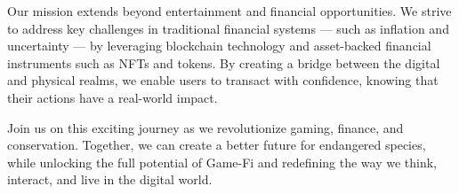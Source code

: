 Our mission extends beyond entertainment and financial opportunities. We strive to address key challenges in traditional financial systems --- such as inflation and uncertainty --- by leveraging blockchain technology and asset-backed financial instruments such as NFTs and tokens. By creating a bridge between the digital and physical realms, we enable users to transact with confidence, knowing that their actions have a real-world impact.

Join us on this exciting journey as we revolutionize gaming, finance, and conservation. Together, we can create a better future for endangered species, while unlocking the full potential of Game-Fi and redefining the way we think, interact, and live in the digital world.
